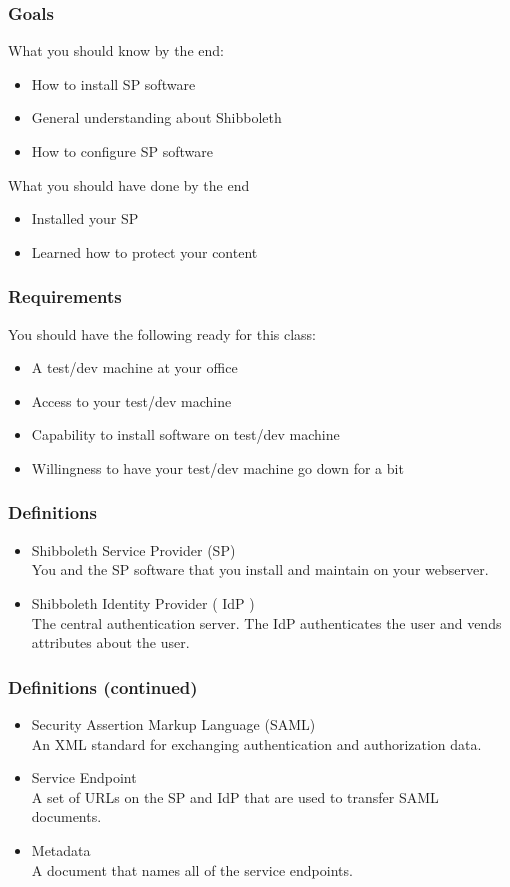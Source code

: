 


\begin{frame}
\frametitle{Goals}

What you should know by the end:
\begin{itemize}
\item How to install SP software
\item General understanding about Shibboleth
\item How to configure SP software
\end{itemize}

\bigskip

What you should have done by the end
\begin{itemize}
\item Installed your SP
\item Learned how to protect your content
\end{itemize}

\end{frame}

\begin{frame}
\frametitle{Requirements}

You should have the following ready for this class:
\begin{itemize}
\item A test/dev machine at your office
\item Access to your test/dev machine
\item Capability to install software on test/dev machine
\item Willingness to have your test/dev machine go down for a bit
\end{itemize}

\end{frame}

\begin{frame}
\frametitle{Definitions}
\begin{itemize} 
\item Shibboleth Service Provider (SP) \\ You and the SP software that you install and maintain on your webserver.
\item Shibboleth Identity Provider ( IdP ) \\ The central authentication server. The IdP authenticates the user and vends attributes about the user.
\end{itemize}
\end{frame}

\begin{frame}
\frametitle{Definitions (continued)}
\begin{itemize}
\item Security Assertion Markup Language (SAML) \\ An XML standard for exchanging authentication and authorization data.
\item Service Endpoint \\ A set of URLs on the SP and IdP that are used to transfer SAML documents.
\item Metadata \\ A document that names all of the service endpoints.
\end{itemize}
\end{frame}

